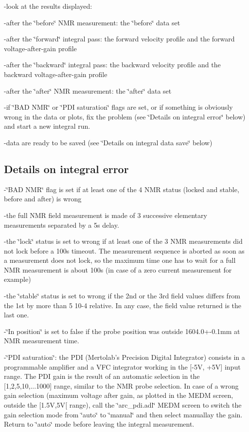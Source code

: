 -look at the results displayed: 

-after the \char`\"{}before\char`\"{} NMR measurement: the \char`\"{}before\char`\"{}
data set 

-after the \char`\"{}forward\char`\"{} integral pass: the forward velocity profile
and the forward voltage-after-gain profile 

-after the \char`\"{}backward\char`\"{} integral pass: the backward velocity
profile and the backward voltage-after-gain profile 

-after the \char`\"{}after\char`\"{} NMR measurement: the \char`\"{}after\char`\"{}
data set 

-if \char`\"{}BAD NMR\char`\"{} or \char`\"{}PDI saturation\char`\"{} flags
are set, or if something is obviously wrong in the data or plots, fix the problem
(see \char`\"{}Details on integral error\char`\"{} below) and start a new integral
run. 

-data are ready to be saved (see \char`\"{}Details on integral data save\char`\"{}
below) 


\subsection{Details on integral error }

-\char`\"{}BAD NMR\char`\"{} flag is set if at least one of the 4 NMR status
(locked and stable, before and after) is wrong 

-the full NMR field measurement is made of 3 successive elementary measurements
separated by a 5s delay. 

-the \char`\"{}lock\char`\"{} status is set to wrong if at least one of the
3 NMR measurements did not lock before a 100s timeout. The measurement sequence
is aborted as soon as a measurement does not lock, so the maximum time one has
to wait for a full NMR measurement is about 100s (in case of a zero current
measurement for example) 

-the \char`\"{}stable\char`\"{} status is set to wrong if the 2nd or the 3rd
field values differs from the 1st by more than 5 10-4 relative. In any case,
the field value returned is the last one. 

-\char`\"{}In position\char`\"{} is set to false if the probe position was outside
1604.0+-0.1mm at NMR measurement time. 

-\char`\"{}PDI saturation\char`\"{}: the PDI (Mertolab's Precision Digital Integrator)
consists in a programmable amplifier and a VFC integrator working in the {[}-5V,
+5V{]} input range. The PDI gain is the result of an automatic selection in
the {[}1,2,5,10,...1000{]} range, similar to the NMR probe selection. In case
of a wrong gain selection (maximum voltage after gain, as plotted in the MEDM
screen, outside the {[}1.5V,5V{[} range), call the \char`\"{}arc\_pdi.adl\char`\"{}
MEDM screen to switch the gain selection mode from \char`\"{}auto\char`\"{}
to \char`\"{}manual\char`\"{} and then select manuallay the gain. Return to
\char`\"{}auto\char`\"{} mode before leaving the integral measurement. 

